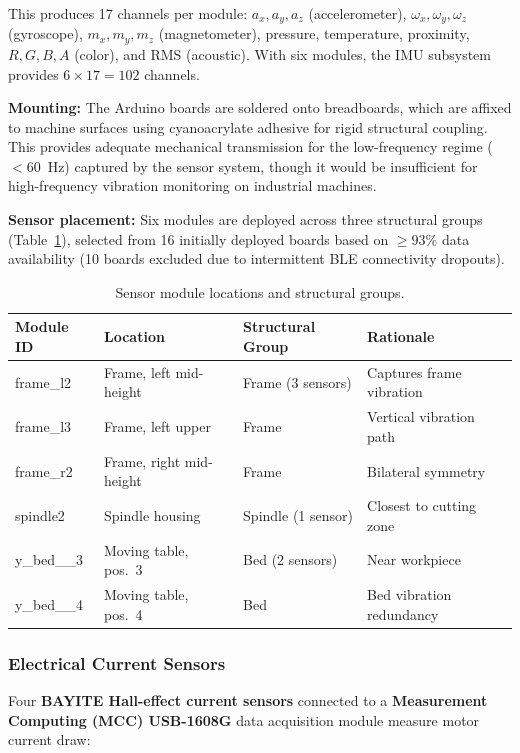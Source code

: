 This produces 17 channels per module: $a_x, a_y, a_z$ (accelerometer), $\omega_x, \omega_y, \omega_z$ (gyroscope), $m_x, m_y, m_z$ (magnetometer), pressure, temperature, proximity, $R, G, B, A$ (color), and RMS (acoustic). With six modules, the IMU subsystem provides $6 \times 17 = 102$ channels.

\textbf{Mounting:} The Arduino boards are soldered onto breadboards, which are affixed to machine surfaces using cyanoacrylate adhesive for rigid structural coupling. This provides adequate mechanical transmission for the low-frequency regime ($< 60$~Hz) captured by the sensor system, though it would be insufficient for high-frequency vibration monitoring on industrial machines.

\textbf{Sensor placement:} Six modules are deployed across three structural groups (Table~\ref{tab:sensor_placement}), selected from 16 initially deployed boards based on $\geq 93\%$ data availability (10 boards excluded due to intermittent BLE connectivity dropouts).

\begin{table}[H]
\caption{Sensor module locations and structural groups.}\label{tab:sensor_placement}
\centering
\begin{tabular}{llll}
\toprule
\textbf{Module ID} & \textbf{Location} & \textbf{Structural Group} & \textbf{Rationale} \\
\midrule
frame\_l2  & Frame, left mid-height  & Frame (3 sensors) & Captures frame vibration \\
frame\_l3  & Frame, left upper       & Frame              & Vertical vibration path \\
frame\_r2  & Frame, right mid-height & Frame              & Bilateral symmetry \\
spindle2   & Spindle housing         & Spindle (1 sensor) & Closest to cutting zone \\
y\_bed\_\_3 & Moving table, pos.\ 3  & Bed (2 sensors)    & Near workpiece \\
y\_bed\_\_4 & Moving table, pos.\ 4  & Bed                & Bed vibration redundancy \\
\bottomrule
\end{tabular}
\end{table}

\subsubsection{Electrical Current Sensors}

Four \textbf{BAYITE Hall-effect current sensors} connected to a \textbf{Measurement Computing (MCC) USB-1608G} data acquisition module measure motor current draw:


